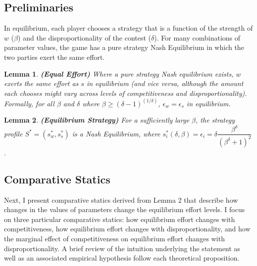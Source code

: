 \documentclass[12pt]{article}
\newtheorem{lemma}{Lemma}
\begin{document}
\subsection*{Preliminaries}

In equilibrium, each player chooses a strategy that is a function of the strength of $w$ ($\beta$) and the disproportionality of the contest ($\delta$). For many combinations of parameter values, the game has a pure strategy Nash Equilibrium in which the two parties exert the same effort. 

\begin{lemma}
\textbf{(Equal Effort)} Where a pure strategy Nash equilibrium exists, $w$ exerts the same effort as $s$ in equilibrium (and vice versa, although the amount each chooses might vary across levels of competitiveness and disproportionality). Formally, for all $\beta$ and $\delta$ where $\beta \geq (\delta - 1)^{(1/\delta)}$, $\epsilon_w = \epsilon_s$ in equilibrium.

\end{lemma}

\begin{lemma}
\textbf{(Equilibrium Strategy)} For a sufficiently large $\beta$, the strategy profile $S^* = (s_w^*, s_s^*)$ is a Nash Equilibrium, where $s_i^*(\delta, \beta) = \epsilon_i = \delta\dfrac{\beta^\delta}{(\beta^\delta + 1)^2}$.

\end{lemma}

\subsection*{Comparative Statics}

Next, I present comparative statics derived from Lemma 2 that describe how changes in the values of parameters change the equilibrium effort levels. I focus on three particular comparative statics: how equilibrium effort changes with competitiveness, how equilibrium effort changes with disproportionality, and how the marginal effect of competitiveness on equilibrium effort changes with disproportionality. A brief review of the intuition underlying the statement as well as an associated empirical hypothesis follow each theoretical proposition. 
\end{document}
